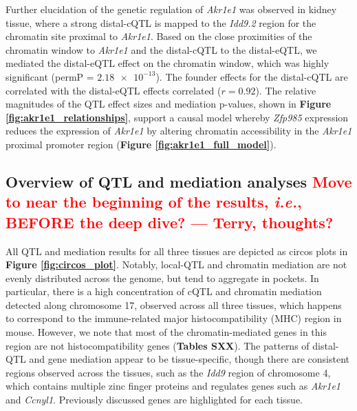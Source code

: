 \documentclass[9pt,twocolumn,twoside]{gsajnl}
\newcommand{\ie}{\emph{i.e.}\xspace}
\newcommand{\WVinline}[1]{\textcolor{red}{#1}}
\begin{document}
Further elucidation of the genetic regulation of \textit{Akr1e1} was observed in kidney tissue, where a strong distal-cQTL is mapped to the \textit{Idd9.2} region for the chromatin site proximal to \textit{Akr1e1}. Based on the close proximities of the chromatin window to \textit{Akr1e1} and the distal-cQTL to the distal-eQTL, we mediated the distal-eQTL effect on the chromatin window, which was highly significant (permP = $\num{2.18e-13}$). The founder effects for the distal-cQTL are correlated with the distal-eQTL effects correlated ($r = 0.92$). The relative magnitudes of the QTL effect sizes and mediation p-values, shown in \textbf{Figure \ref{fig:akr1e1_relationships}}, support a causal model whereby \textit{Zfp985} expression reduces the expression of \textit{Akr1e1} by altering chromatin accessibility in the \textit{Akr1e1} proximal promoter region (\textbf{Figure \ref{fig:akr1e1_full_model}}). 

\subsection{Overview of QTL and mediation analyses \WVinline{Move to near the beginning of the results, \ie, BEFORE the deep dive? --- Terry, thoughts?}}

All QTL and mediation results for all three tissues are depicted as circos plots \citep{Gu2014} in \textbf{Figure \ref{fig:circos_plot}}. Notably, local-QTL and chromatin mediation are not evenly distributed across the genome, but tend to aggregate in pockets. In particular, there is a high concentration of cQTL and chromatin mediation detected along chromosome 17, observed across all three tissues, which happens to correspond to the immune-related major histocompatibility (MHC) region in mouse. However, we note that most of the chromatin-mediated genes in this region are not histocompatibility genes (\textbf{Tables SXX}). The patterns of distal-QTL and gene mediation appear to be tissue-specific, though there are consistent regions observed across the tissues, such as the \textit{Idd9} region \citep{HamiltonWilliams2010} of chromosome 4, which contains multiple zinc finger proteins and regulates genes such as \textit{Akr1e1} and \textit{Ccnyl1}. Previously discussed genes are highlighted for each tissue.
\end{document}
